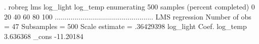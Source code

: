 . robreg lms log_light log_temp
{\smallskip}
enumerating 500 samples (percent completed)
0  20  40  60  80  100
..................................................
{\smallskip}
LMS regression                                  Number of obs     =         47
                                                  Subsamples      =        500
                                                  Scale estimate  =  .36429398
{\smallskip}
   log_light {\VBAR}      Coef.
    log_temp {\VBAR}   3.636368
       _cons {\VBAR}  -11.20184
{\smallskip}
